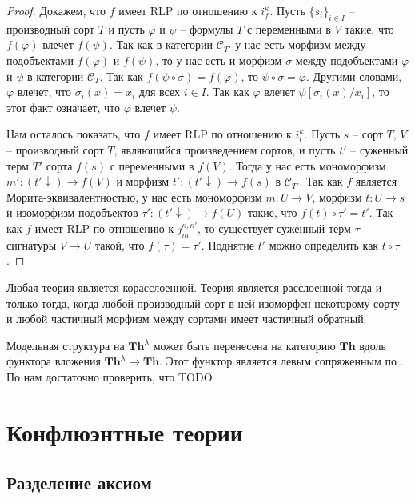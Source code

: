 \documentclass[reqno]{amsart}
\theoremstyle{definition}
\theoremstyle{remark}
\newcommand{\bcat}[1]{\mathbf{#1}}
\newcommand{\cat}[1]{\mathcal{#1}}
\newcommand{\Th}{\bcat{Th}}
\begin{document}
\begin{proof}
Докажем, что $f$ имеет RLP по отношению к $i^\kappa_f$.
Пусть $\{ s_i \}_{i \in I}$ -- производный сорт $T$ и пусть $\varphi$ и $\psi$ -- формулы $T$ с переменными в $V$ такие, что $f(\varphi)$ влечет $f(\psi)$.
Так как в категории $\cat{C}_{T'}$ у нас есть морфизм между подобъектами $f(\varphi)$ и $f(\psi)$, то у нас есть и морфизм $\sigma$ между подобъектами $\varphi$ и $\psi$ в категории $\cat{C}_T$.
Так как $f(\psi \circ \sigma) = f(\varphi)$, то $\psi \circ \sigma = \varphi$.
Другими словами, $\varphi$ влечет, что $\sigma_i(\overline{x}) = x_i$ для всех $i \in I$.
Так как $\varphi$ влечет $\psi[\sigma_i(\overline{x})/x_i]$, то этот факт означает, что $\varphi$ влечет $\psi$.

Нам осталось показать, что $f$ имеет RLP по отношению к $i^\kappa_t$.
Пусть $s$ -- сорт $T$, $V$ -- производный сорт $T$, являющийся произведением сортов, и пусть $t'$ -- суженный терм $T'$ сорта $f(s)$ с переменными в $f(V)$.
Тогда у нас есть мономорфизм $m' : (t'\!\downarrow) \to f(V)$ и морфизм $t' : (t'\!\downarrow) \to f(s)$ в $\cat{C}_{T'}$.
Так как $f$ является Морита-эквивалентностью, у нас есть мономорфизм $m : U \to V$, морфизм $t : U \to s$ и изоморфизм подобъектов $\tau' : (t'\!\downarrow) \to f(U)$ такие, что $f(t) \circ \tau' = t'$.
Так как $f$ имеет RLP по отношению к $j_m^{\kappa,\kappa'}$, то существует суженный терм $\tau$ сигнатуры $V \to U$ такой, что $f(\tau) = \tau'$.
Поднятие $t'$ можно определить как $t \circ \tau$.
\end{proof}

\begin{remark}
Любая теория является корасслоенной.
Теория является расслоенной тогда и только тогда, когда любой производный сорт в ней изоморфен некоторому сорту и любой частичный морфизм между сортами имеет частичный обратный.
\end{remark}

Модельная структура на $\Th^\lambda$ может быть перенесена на категорию $\Th$ вдоль функтора вложения $\Th^\lambda \to \Th$.
Этот функтор является левым сопряженным по .
По  нам достаточно проверить, что TODO

\section{Конфлюэнтные теории}

\subsection{Разделение аксиом}
\end{document}
